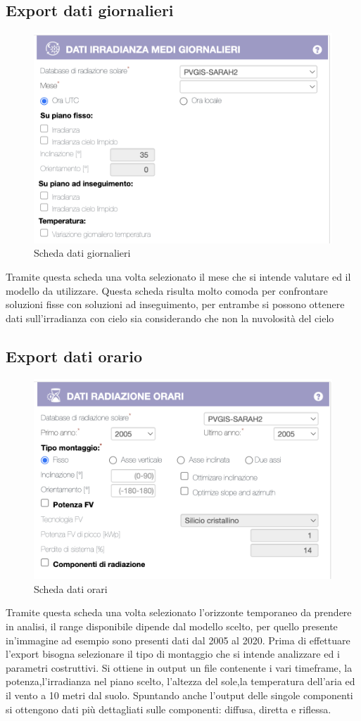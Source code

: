 \subsection{Export dati giornalieri}
\begin{figure}[H]
    \centering
    \includegraphics[height=0.5\textwidth]{res/cap 4/dati giornalieri}
    \caption{Scheda dati giornalieri}
\end{figure}\noindent
Tramite questa scheda una volta selezionato il mese che si intende valutare  ed il modello da utilizzare.
Questa scheda risulta molto comoda per confrontare soluzioni fisse con soluzioni ad inseguimento, per entrambe si possono ottenere dati sull'irradianza con cielo sia considerando che non la nuvolosità del cielo

\subsection{Export dati orario}
\label{subsec:export orario}
\begin{figure}[H]
    \centering
    \includegraphics[height=0.5\textwidth]{res/cap 4/dati orari}
    \caption{Scheda dati orari}
\end{figure}\noindent
Tramite questa scheda una volta selezionato l'orizzonte temporaneo da prendere in analisi, il range disponibile dipende dal modello scelto, per quello presente in'immagine ad esempio sono presenti dati dal 2005 al 2020.
Prima di effettuare l'export bisogna selezionare il tipo di montaggio che si intende analizzare ed i parametri costruttivi.
Si ottiene in output un file contenente i vari timeframe, la potenza,l'irradianza nel piano scelto, l'altezza del sole,la temperatura dell'aria ed il vento a 10 metri dal suolo.
Spuntando anche l'output delle singole componenti si ottengono dati più dettagliati sulle componenti: diffusa, diretta e riflessa.

